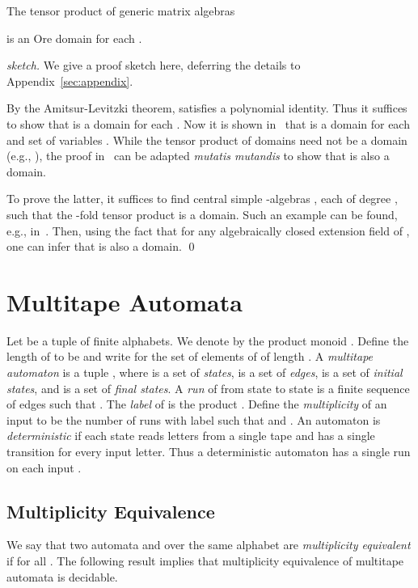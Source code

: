 \documentclass[runningheads]{llncs}
\begin{document}
\begin{proposition}
  The tensor product of generic matrix algebras
  
  is an Ore domain for each .
\label{prop:ore}
\end{proposition}
\begin{proof}[sketch]
  We give a proof sketch here, deferring the details to
  Appendix~\ref{sec:appendix}.

By the Amitsur-Levitzki theorem,  satisfies a polynomial
identity.  Thus it suffices to show that  is a domain for each
.  Now it is shown in~\cite[Proposition 7.7.2]{Cohn03} that
 is a domain for each  and set of variables
.  While the tensor product of domains need not be a domain (e.g.,
), the proof in~\cite{Cohn03} can be adapted \emph{mutatis
  mutandis} to show that  is also a domain.

To prove the latter, it suffices to find central simple -algebras
, each of degree , such that the -fold tensor
product  is a domain.  Such an example
can be found, e.g., in~\cite[Proposition 1.1]{Saltman}.  Then, using
the fact that  for any algebraically
closed extension field of , one can infer that  is also a
domain.  \qed
\end{proof}

\section{Multitape Automata}
\label{sec:multitape}
Let  be a tuple of finite
alphabets.  We denote by  the product monoid .  Define the length of  to be  and write  for the set
of elements of  of length .  A \emph{multitape automaton} is a
tuple , where  is a set of \emph{states},  is a set of \emph{edges},  is a set of \emph{initial states}, and  is
a set of \emph{final states}.  A \emph{run} of  from state  to
state  is a finite sequence of edges 
such that .  The \emph{label} of  is
the product .  Define the \emph{multiplicity}
 of an input  to be the number of runs with label 
such that  and .  An automaton is
\emph{deterministic} if each state reads letters from a single tape
and has a single transition for every input letter.  Thus a
deterministic automaton has a single run on each input .

\subsection{Multiplicity Equivalence}
We say that two automata  and  over the same alphabet are
\emph{multiplicity equivalent} if  for all .  The
following result implies that multiplicity equivalence of multitape
automata is decidable.
\end{document}
